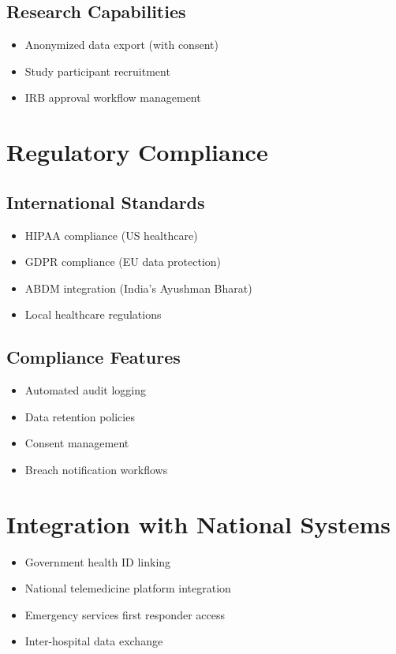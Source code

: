 \subsection{Research Capabilities}
\begin{itemize}
    \item Anonymized data export (with consent)
    \item Study participant recruitment
    \item IRB approval workflow management
\end{itemize}

\section{Regulatory Compliance}

\subsection{International Standards}
\begin{itemize}
    \item HIPAA compliance (US healthcare)
    \item GDPR compliance (EU data protection)
    \item ABDM integration (India's Ayushman Bharat)
    \item Local healthcare regulations
\end{itemize}

\subsection{Compliance Features}
\begin{itemize}
    \item Automated audit logging
    \item Data retention policies
    \item Consent management
    \item Breach notification workflows
\end{itemize}

\section{Integration with National Systems}

\begin{itemize}
    \item Government health ID linking
    \item National telemedicine platform integration
    \item Emergency services first responder access
    \item Inter-hospital data exchange
\end{itemize}

